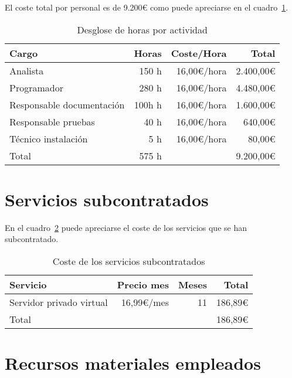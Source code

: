 El coste total por personal es de 9.200\euro{} como puede apreciarse en el cuadro~\ref{tab:des_prec_horas}.

\begin{table}
	\centering
	
	\begin{tabular}{|l|r|r|r|}
		\hline
		Cargo & Horas & Coste/Hora & Total \\
		\hline
		Analista & 150 h & 16,00\euro/hora & 2.400,00\euro\\
		\hline
		Programador & 280 h & 16,00\euro/hora & 4.480,00\euro\\
		\hline
		Responsable documentación & 100h h & 16,00\euro/hora & 1.600,00\euro\\
		\hline
		Responsable pruebas & 40 h & 16,00\euro/hora & 640,00\euro\\
		\hline
		Técnico instalación & 5 h & 16,00\euro/hora & 80,00\euro\\
		\hline
		\hline
		Total & 575 h & \multicolumn{2}{|r|}{9.200,00\euro} \\
		\hline
	\end{tabular}
	\caption{Desglose de horas por actividad}\label{tab:des_prec_horas}
\end{table}


\section{Servicios subcontratados}

En el cuadro~\ref{tab:serv_subcont} puede apreciarse el coste de los servicios que se han subcontratado.

\begin{table}
	\centering
	
	\begin{tabular}{|l|r|r|r|}
		\hline
		Servicio & Precio mes & Meses & Total\\
		\hline
		Servidor privado virtual & 16,99\euro/mes & 11 & 186,89\euro\\
		\hline
		\hline
		\multicolumn{3}{|l|}{Total} & 186,89\euro\\
		\hline
	\end{tabular}
	\caption{Coste de los servicios subcontratados}\label{tab:serv_subcont}
\end{table}

\section{Recursos materiales empleados}

